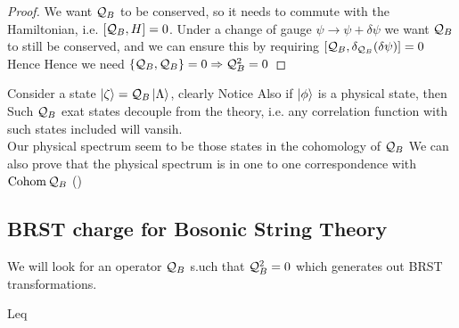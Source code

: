 \documentclass{article}
\begin{document}
\begin{prop}
\end{prop}
\begin{proof}
We want $\mc{Q}_B$ to be conserved, so it needs to commute with the Hamiltonian, i.e. $\comm[\mc{Q}_B]{H}=0$. Under a change of gauge $\psi \to \psi + \delta \psi$ we want $\mc{Q}_B$ to still be conserved, and we can ensure this by requiring $\comm[\mc{Q}_B]{\delta_{\mc{Q}_B} (\delta \psi)}=0$
Hence 
Hence we need $\acomm[\mc{Q}_B]{\mc{Q}_B}=0 \Rightarrow \mc{Q}_B^2 = 0$
\end{proof}

Consider a state $\ket{\zeta} = \mc{Q}_B \ket{\Lambda}$, clearly 
Notice 
Also if $\ket{\phi}$ is a physical state, then 
Such $\mc{Q}_B$ exat states decouple from the theory, i.e. any correlation function with such states included will vansih. \\
Our physical spectrum seem to be those states in the cohomology of $\mc{Q}_B$
We can also prove that the physical spectrum is in one to one correspondence with $\cohom \mc{Q}_B$ ()

\subsection{BRST charge for Bosonic String Theory}
We will look for an operator $\mc{Q}_B$ s.uch that $\mc{Q}_B^2 = 0$ which generates out BRST transformations. 

Leq 
\end{document}
